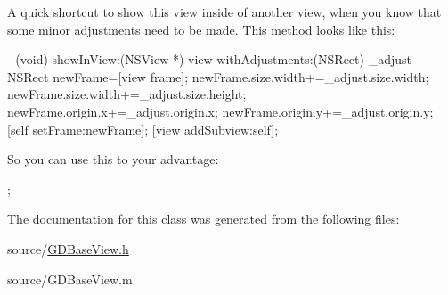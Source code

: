 A quick shortcut to show this view inside of another view, when you know that some minor adjustments need to be made. This method looks like this: 
\begin{DoxyCode}
 - (void) showInView:(NSView *) view withAdjustments:(NSRect) _adjust {
     NSRect newFrame=[view frame];
     newFrame.size.width+=_adjust.size.width;
     newFrame.size.width+=_adjust.size.height;
     newFrame.origin.x+=_adjust.origin.x;
     newFrame.origin.y+=_adjust.origin.y;
     [self setFrame:newFrame];
     [view addSubview:self];
 }
\end{DoxyCode}


So you can use this to your advantage: 
\begin{DoxyCode}
 ;
\end{DoxyCode}
 

The documentation for this class was generated from the following files:\begin{DoxyCompactItemize}
\item 
source/\hyperlink{_g_d_base_view_8h}{GDBaseView.h}\item 
source/GDBaseView.m\end{DoxyCompactItemize}
